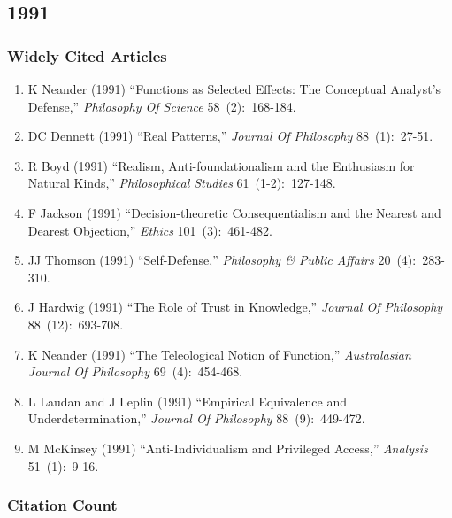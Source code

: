 \documentclass[
  10pt,
  letterpaper,
  DIV=11,
  numbers=noendperiod,
  twoside]{scrartcl}
\providecommand{\tightlist}{%
  \setlength{\itemsep}{0pt}\setlength{\parskip}{0pt}}\usepackage{longtable,booktabs,array}
\begin{document}
\newpage

\subsection{1991}\label{sec-s1991}

\subsubsection*{Widely Cited Articles}\label{widely-cited-articles-34}

\begin{enumerate}
\def\labelenumi{\arabic{enumi}.}
\tightlist
\item
  K Neander (1991) ``Functions as Selected Effects: The Conceptual
  Analyst's Defense,'' \emph{Philosophy Of Science} 58~(2):~168-184.
\item
  DC Dennett (1991) ``Real Patterns,'' \emph{Journal Of Philosophy}
  88~(1):~27-51.
\item
  R Boyd (1991) ``Realism, Anti-foundationalism and the Enthusiasm for
  Natural Kinds,'' \emph{Philosophical Studies} 61~(1-2):~127-148.
\item
  F Jackson (1991) ``Decision-theoretic Consequentialism and the Nearest
  and Dearest Objection,'' \emph{Ethics} 101~(3):~461-482.
\item
  JJ Thomson (1991) ``Self-Defense,'' \emph{Philosophy \& Public
  Affairs} 20~(4):~283-310.
\item
  J Hardwig (1991) ``The Role of Trust in Knowledge,'' \emph{Journal Of
  Philosophy} 88~(12):~693-708.
\item
  K Neander (1991) ``The Teleological Notion of Function,''
  \emph{Australasian Journal Of Philosophy} 69~(4):~454-468.
\item
  L Laudan and J Leplin (1991) ``Empirical Equivalence and
  Underdetermination,'' \emph{Journal Of Philosophy} 88~(9):~449-472.
\item
  M McKinsey (1991) ``Anti-Individualism and Privileged Access,''
  \emph{Analysis} 51~(1):~9-16.
\end{enumerate}

\subsubsection*{Citation Count}\label{sec-count-1991}
\end{document}
